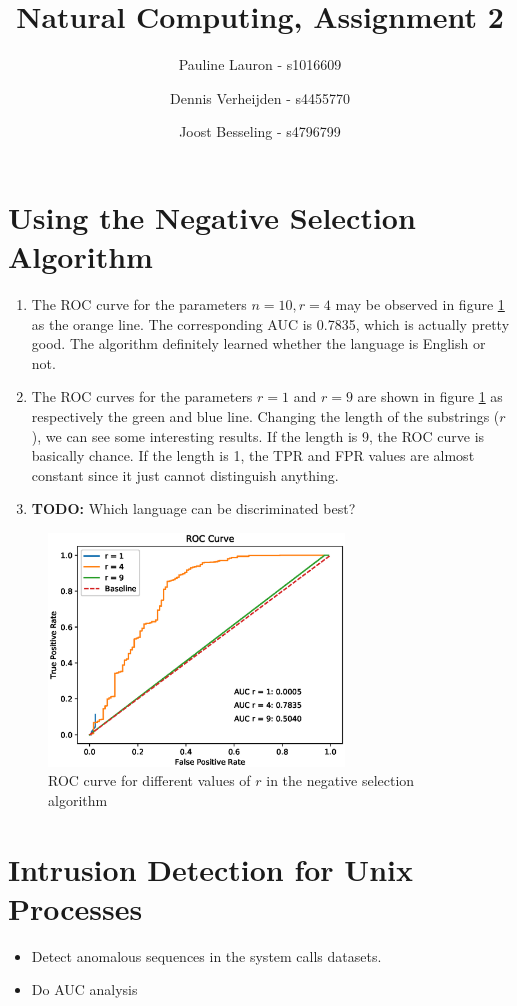 \documentclass[11pt]{article}
\title{Natural Computing, Assignment 2}
\author{Pauline Lauron - s1016609 \and Dennis Verheijden - s4455770 \and Joost Besseling - s4796799}
\begin{document}
\maketitle

\section{Using the Negative Selection Algorithm}
\begin{enumerate}[1.]
\item The ROC curve for the parameters $n=10, r=4$ may be observed in figure \ref{fig:ROC_ex1} as the orange line. The corresponding AUC is 0.7835, which is actually pretty good. The algorithm definitely learned whether the language is English or not.
\item The ROC curves for the parameters $r=1$ and $r=9$ are shown in figure \ref{fig:ROC_ex1} as respectively the green and blue line. Changing the length of the substrings ($r$), we can see some interesting results. If the length is 9, the ROC curve is basically chance. If the length is 1, the TPR and FPR values are almost constant since it just cannot distinguish anything.
\item \textbf{TODO:} Which language can be discriminated best?
\end{enumerate}

\begin{figure}[H]
\centering
\includegraphics[width=0.7\textwidth]{images/roc_ex1.eps}
\caption{ROC curve for different values of $r$ in the negative selection algorithm}
\label{fig:ROC_ex1}
\end{figure}

\section{Intrusion Detection for Unix Processes}
\begin{itemize}
\item Detect anomalous sequences in the system calls datasets.
\item Do AUC analysis
\end{itemize}
\end{document}
